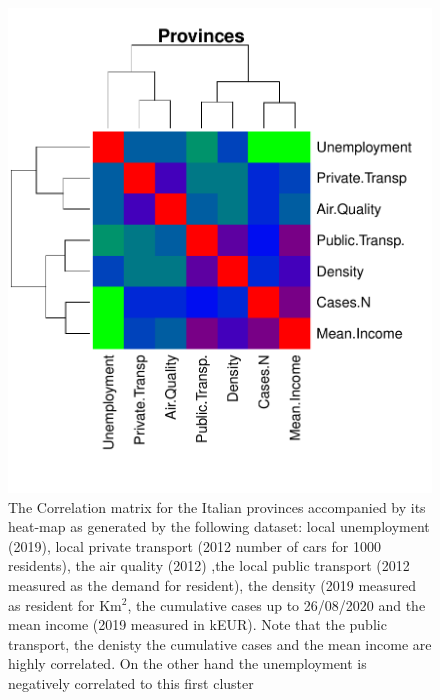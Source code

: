 \documentclass[
12pt, %
a4paper, %
oneside, %
headinclude,footinclude, %
BCOR5mm, %
]{scrartcl}
\begin{document}
\begin{figure}[h]
\begin{center}
\includegraphics[scale=1]{Pic/Province_FULL_CorrMatrix.pdf}
\caption{The Correlation matrix for the Italian provinces accompanied by its heat-map as generated by the following dataset: local unemployment (2019), local private transport (2012 number of cars for 1000 residents), the air quality (2012) ,the local public transport (2012 measured as the demand for resident), the density  (2019 measured as resident for Km$^{2}$, the cumulative cases up to 26/08/2020 and the mean income (2019 measured in kEUR). Note that the public transport, the denisty the cumulative cases and the mean income are highly correlated. On the other hand the unemployment is negatively correlated to this first cluster}
\label{Province_corr_matrix}
\end{center}
\end{figure}
\end{document}
